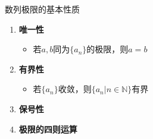 \begin{frame}{数列极限的基本性质}
	\linespread{1.5}
	\begin{enumerate}\pause 
	  \item {\bf 唯一性}\pause 
	  \begin{itemize}
	    \item 若$a,b$同为$\{a_n\}$的极限，则$a=b$\pause
	  \end{itemize}
	  \item {\bf 有界性}\pause 
	  \begin{itemize}
	    \item 若$\{a_n\}$收敛，则$\{a_n|n\in\mathbb{N}\}$有界\pause
	  \end{itemize}
	  \item {\bf 保号性}\pause 
	  \item {\bf 极限的四则运算}
	\end{enumerate}
\end{frame}

